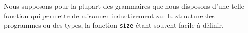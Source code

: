 Nous supposons pour la plupart des grammaires que nous disposons d'une telle
fonction qui permette de raisonner inductivement sur la structure des
programmes ou des types, la fonction \verb|size| étant souvent facile à définir.


%
%
%
%
%
%
%
%
%
%
